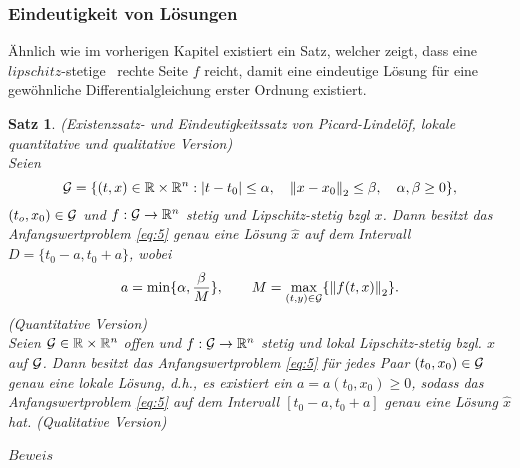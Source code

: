 \documentclass[
    paper=a4, %
    fontsize=12pt,  %
    oneside,        %
    headsepline,    %
    notitlepage     %
]{extarticle}         %
\newtheorem{satz}[theorem]{Satz}
\begin{document}
    \subsubsection{Eindeutigkeit von Lösungen}
    Ähnlich wie im vorherigen Kapitel existiert ein Satz, welcher zeigt, dass eine $lipschitz$-stetige~\cite{LipschitzStetigkeitSerloMathe}
    rechte Seite $f$ reicht, damit eine eindeutige Lösung für eine
    gewöhnliche Differentialgleichung erster Ordnung existiert.
    \begin{satz}
        (Existenzsatz- und Eindeutigkeitssatz von Picard-Lindelöf, lokale quantitative und qualitative Version) \\
        Seien
        \[
            {\cal G}=\{(t,x) \in \mathbb{R} \times \mathbb{R}^{n}: |t-t_{0}| \leq \alpha, \quad
            \left\lVert x-x_{0} \right\rVert _{2} \leq\beta, \quad \alpha,\beta \geq 0 \},
        \]
        $(t_{o},x_{0})\in {\cal G}$ und $f:{\cal G} \rightarrow \mathbb{R}^{n}$ stetig und Lipschitz-stetig bzgl $x$.
        Dann besitzt das Anfangswertproblem \eqref{eq:5} genau eine Lösung $\hat{x}$ auf dem Intervall
        $D=\{t_{0}-a,t_{0}+a\}$, wobei
        \[
            a=\min\{\alpha, \frac{\beta}{M}\}, \qquad M= \max_{(t,y)\in {\cal G}}\{\left\lVert f(t,x)\right\rVert_{2} \}
            .
        \](Quantitative Version)\\
        Seien ${\cal G}\in \mathbb{R} \times \mathbb{R}^{n}$ offen und $f:{\cal G} \rightarrow \mathbb{R}^{n}$ stetig und lokal
        Lipschitz-stetig bzgl. $x$ auf $\cal{G}$. Dann besitzt das Anfangswertproblem \eqref{eq:5} für jedes Paar
        $(t_{0},x_{0}) \in {\cal G}$ genau eine lokale Lösung, d.h., es existiert ein $a=a(t_{0},x_{0}) \geq 0$, sodass
        das Anfangswertproblem \eqref{eq:5} auf dem Intervall $[t_{0}-a,t_{0}+a]$ genau eine Lösung $\hat{x}$ hat.
        (Qualitative Version)
    \end{satz}
    $Beweis$ \cite[56-58]{beckGewohnlicheDifferentialgleichungen2018}~\cite{stykelSkriptZurVorlesung2020}
\end{document}
